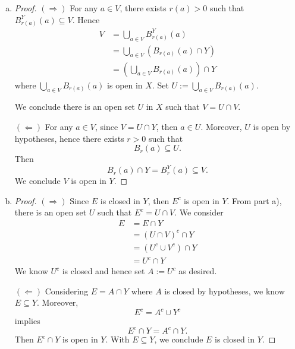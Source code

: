 \begin{Exercise}
\begin{enumerate}[a)]
\item
\begin{proof}
$(\Longrightarrow)$
For any $a\in V$, there exists $r(a)>0$ such that $B_{r(a)}^Y(a)\subseteq V$. Hence
\begin{align*}
V
&= \bigcup_{a\in V}B_{r(a)}^Y(a) \\
&= \bigcup_{a\in V}\left( B_{r(a)}(a)\cap Y \right) \\
&= \left( \bigcup_{a\in V}B_{r(a)}(a) \right) \cap Y
\end{align*}
where $\bigcup_{a\in V}B_{r(a)}(a)$ is open in $X$.
Set $U := \bigcup_{a\in V}B_{r(a)}(a)$. 

We conclude there is an open set $U$ in $X$ such that $V=U\cap V$.

\vspace{2ex}

$(\Longleftarrow)$
For any $a\in V$, since $V=U\cap Y$, then $a\in U$. Moreover, $U$ is open by hypotheses, hence there exists $r>0$ such that 
$$
B_r(a)\subseteq U.
$$
Then
$$
B_r(a)\cap Y = B_r^Y(a) \subseteq V.
$$
We conclude $V$ is open in $Y$.
\end{proof}

\item
\begin{proof}
$(\Longrightarrow)$
Since $E$ is closed in $Y$, then $E^c$ is open in $Y$. From part a), there is an open set $U$ such that $E^c = U\cap V$. We consider
\begin{align*}
E
&= E\cap Y \\
&= \left( U\cap V \right)^c \cap Y \\
&= \left( U^c\cup V^c \right) \cap Y \\
&= U^c\cap Y
\end{align*}
We know $U^c$ is closed and hence set $A:=U^c$ as desired.

\vspace{2ex}

$(\Longleftarrow)$
Considering $E=A\cap Y$ where $A$ is closed by hypotheses, we know $E\subseteq Y$. Moreover, 
$$
E^c = A^c\cup Y^c
$$ 
implies 
$$
E^c\cap Y = A^c\cap Y.
$$
Then $E^c\cap Y$ is open in $Y$. With $E\subseteq Y$, we conclude $E$ is closed in $Y$.
\end{proof}
\end{enumerate}
\end{Exercise}